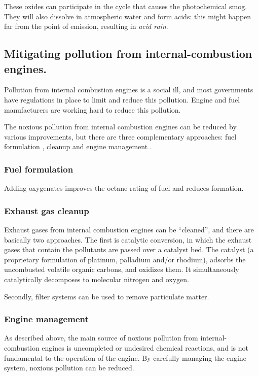 These oxides can participate in the cycle that causes the photochemical smog.
They will also dissolve in atmospheric water and form acids: this might happen
far from the point of emission, resulting in \textit{acid rain}. 

\subsection{Mitigating pollution from internal\hyp{}combustion engines.}
 
Pollution from internal combustion engines is a social ill, and most governments
have regulations in place to limit and reduce this pollution. Engine and fuel
manufacturers are working hard to reduce this pollution.

The noxious pollution from internal combustion engines can be reduced by various
improvements, but there are three complementary approaches: fuel formulation
\autocite{Gertler1999}, cleanup \autocite{Braun2018} and engine management
\autocite{Reif2015}.

\subsubsection{Fuel formulation}

Adding oxygenates improves the octane rating of fuel and reduces \nox formation. 

\subsubsection{Exhaust gas cleanup} \label{par:cleanup}

Exhaust gases from internal combustion engines can be ``cleaned'', and there are
basically two approaches. The first is catalytic conversion, in which the
exhaust gases that contain the pollutants are passed over a catalyst bed. The
catalyst (a proprietary formulation of platinum, palladium and/or rhodium),
adsorbs the uncombusted volatile organic carbons, and oxidizes them. It
simultaneously catalytically decomposes \nox to molecular nitrogen and oxygen.

Secondly, filter systems can be used to remove particulate matter. 

\subsubsection{Engine management} \label{par:engine-management}

As described above, the main source of noxious pollution from
internal\hyp{}combustion engines is uncompleted or undesired chemical reactions,
and is not fundamental to the operation of the engine. By carefully managing the
engine system, noxious pollution can be reduced. 

